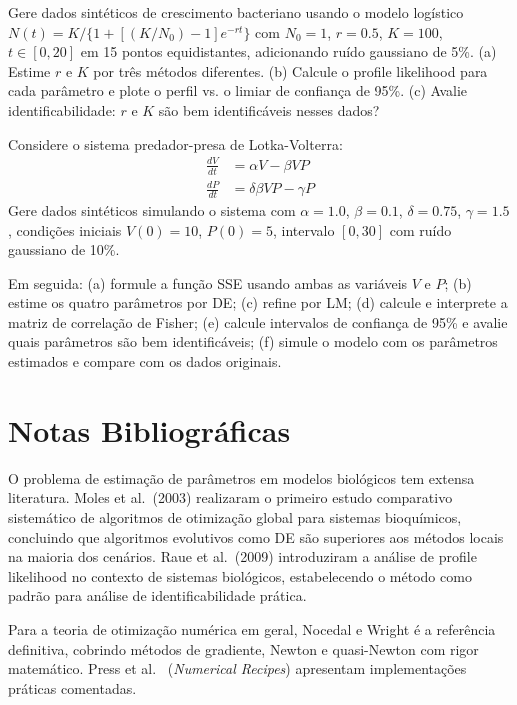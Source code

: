 \begin{exercicio}
Gere dados sintéticos de crescimento bacteriano usando o modelo logístico
$N(t) = K / \{1 + [(K/N_0) - 1] e^{-rt}\}$ com $N_0 = 1$, $r = 0.5$, $K = 100$,
$t \in [0, 20]$ em 15 pontos equidistantes, adicionando ruído gaussiano de 5\%.
(a) Estime $r$ e $K$ por três métodos diferentes. (b) Calcule o profile likelihood
para cada parâmetro e plote o perfil vs. o limiar de confiança de 95\%.
(c) Avalie identificabilidade: $r$ e $K$ são bem identificáveis nesses dados?
\end{exercicio}

\begin{exercicio}
Considere o sistema predador-presa de Lotka-Volterra:
\begin{align*}
\frac{dV}{dt} &= \alpha V - \beta V P \\
\frac{dP}{dt} &= \delta \beta V P - \gamma P
\end{align*}
Gere dados sintéticos simulando o sistema com $\alpha = 1.0$, $\beta = 0.1$,
$\delta = 0.75$, $\gamma = 1.5$, condições iniciais $V(0) = 10$, $P(0) = 5$,
intervalo $[0, 30]$ com ruído gaussiano de 10\%.

Em seguida: (a) formule a função SSE usando ambas as variáveis $V$ e $P$; (b) estime os
quatro parâmetros por DE; (c) refine por LM; (d) calcule e interprete a matriz de
correlação de Fisher; (e) calcule intervalos de confiança de 95\% e avalie quais
parâmetros são bem identificáveis; (f) simule o modelo com os parâmetros estimados
e compare com os dados originais.
\end{exercicio}

\section{Notas Bibliográficas}

O problema de estimação de parâmetros em modelos biológicos tem extensa literatura.
Moles et al.\ (2003) \cite{moles2003} realizaram o primeiro estudo comparativo sistemático
de algoritmos de otimização global para sistemas bioquímicos, concluindo que algoritmos
evolutivos como DE são superiores aos métodos locais na maioria dos cenários. Raue et al.\
(2009) \cite{raue2009} introduziram a análise de profile likelihood no contexto de sistemas
biológicos, estabelecendo o método como padrão para análise de identificabilidade prática.

Para a teoria de otimização numérica em geral, Nocedal e Wright \cite{nocedal2006} é a
referência definitiva, cobrindo métodos de gradiente, Newton e quasi-Newton com rigor
matemático. Press et al.\ \cite{press2007} (\textit{Numerical Recipes}) apresentam
implementações práticas comentadas.

